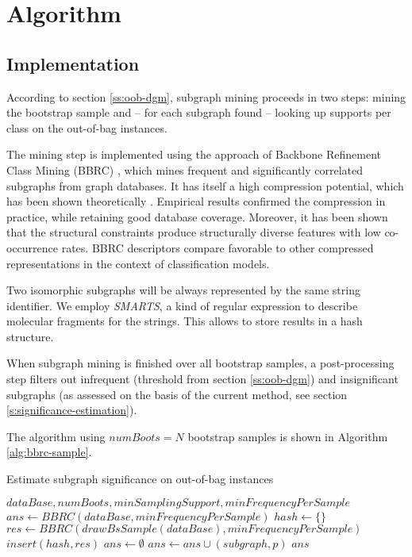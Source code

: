 \documentclass{article}
\begin{document}
\section{Algorithm}
\label{s:Algorithm}

\subsection{Implementation}
\label{ss:Implementation}
According to section \ref{ss:oob-dgm}, subgraph mining proceeds in two steps:
mining the bootstrap sample and -- for each subgraph found -- looking up
supports per class on the out-of-bag instances.

The mining step is implemented using the approach of Backbone Refinement Class
Mining (BBRC) \cite{maunz09largescale}, which mines frequent and significantly
correlated subgraphs from graph databases. It has itself a high
compression potential, which has been shown theoretically
\cite{maunz11efficient}. Empirical results confirmed the compression in
practice, while retaining good database coverage.  Moreover, it has been shown
that the structural constraints produce structurally diverse features with low
co-occurrence rates. BBRC descriptors compare favorable to other compressed
representations in the context of classification models.

Two isomorphic subgraphs will be always represented by the same string
identifier. We employ \emph{SMARTS}, a kind of regular expression to describe
molecular fragments for the strings. This allows to store results in a hash
structure.

When subgraph mining is finished over all bootstrap samples, a post-processing
step filters out infrequent (threshold from section \ref{ss:oob-dgm}) and
insignificant subgraphs (as assessed on the basis of the current method, see
section \ref{s:significance-estimation}). 

The algorithm using $numBoots=N$ bootstrap samples is shown in Algorithm
\ref{alg:bbrc-sample}.

\renewcommand{\algorithmicrequire}{\textbf{Input:}}
\renewcommand{\algorithmicensure}{\textbf{Output:}}
\begin{algorithm}
  \caption{Estimate subgraph significance on out-of-bag instances}
  \label{alg:bbrc-sample}
\begin{algorithmic}[1]
  \Require $dataBase, numBoots, minSamplingSupport, minFrequencyPerSample$
    \State $ans \gets BBRC(dataBase, minFrequencyPerSample)$
  \Else
    \State $hash \gets \{\}$
     
        \State $res \gets BBRC(drawBsSample(dataBase), minFrequencyPerSample)$
      \State $insert(hash,res)$
    \EndFor
    \State $ans \gets \emptyset$
          \State $ans\gets ans \cup (subgraph,p)$
        \EndIf
      \EndIf
    \EndFor
  \EndIf
  \Ensure $ans$
\end{algorithmic}
\end{algorithm}
\end{document}
